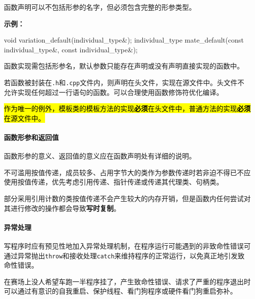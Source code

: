 \documentclass[
]{article}
\newenvironment{Shaded}{}{}
\newcommand{\AttributeTok}[1]{\textcolor[rgb]{0.49,0.56,0.16}{#1}}
\newcommand{\DataTypeTok}[1]{\textcolor[rgb]{0.56,0.13,0.00}{#1}}
\newcommand{\NormalTok}[1]{#1}
\newcommand{\OperatorTok}[1]{\textcolor[rgb]{0.40,0.40,0.40}{#1}}
\begin{document}
函数声明可以不包括形参的名字，但必须包含完整的形参类型。

\textbf{示例：}

\begin{Shaded}
\begin{Highlighting}[]
\DataTypeTok{void}\NormalTok{ variation\_default}\OperatorTok{(}\DataTypeTok{individual\_type}\OperatorTok{\&);}
\DataTypeTok{individual\_type}\NormalTok{ mate\_default}\OperatorTok{(}\AttributeTok{const} \DataTypeTok{individual\_type}\OperatorTok{\&,} \AttributeTok{const} \DataTypeTok{individual\_type}\OperatorTok{\&);}
\end{Highlighting}
\end{Shaded}

函数实现需包括形参名，默认参数只能存在声明或没有声明直接实现的函数中。

若函数被封装在\texttt{.h}和\texttt{.cpp}文件内，则声明在头文件，实现在源文件中。头文件不允许实现任何超过一行语句的函数。可以合理使用函数修饰符优化编译。

\hl{作为唯一的例外，模板类的模板方法的实现\textbf{必须}在头文件中，普通方法的实现\textbf{必须}在源文件中。}

\hypertarget{ux51fdux6570ux5f62ux53c2ux548cux8fd4ux56deux503c}{%
\paragraph{函数形参和返回值}\label{ux51fdux6570ux5f62ux53c2ux548cux8fd4ux56deux503c}}

函数形参的意义、返回值的意义应在函数声明处有详细的说明。

不可滥用按值传递，成员较多、占用字节大的类作为参数传递时若非迫不得已不应使用按值传递，优先考虑引用传递、指针传递或传递其代理类、句柄类。

部分采用引用计数的类按值传递不会产生较大的内存开销，但是函数内任何尝试对其进行修改的操作都会导致\textbf{写时复制}。

\hypertarget{ux5f02ux5e38ux5904ux7406}{%
\paragraph{异常处理}\label{ux5f02ux5e38ux5904ux7406}}

写程序时应有预见性地加入异常处理机制，在程序运行可能遇到的非致命性错误可通过异常抛出\texttt{throw}和接收处理\texttt{catch}来维持程序的正常运行，以免真正地引发致命性错误。

在赛场上没人希望车跑一半程序挂了，产生致命性错误、请求了严重的程序退出时可以通过有意识的自我重启、保护线程、看门狗程序或硬件看门狗重启弥补。
\end{document}
